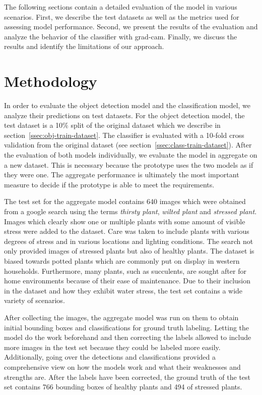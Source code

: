 \documentclass[final]{vutinfth} %
\begin{document}
The following sections contain a detailed evaluation of the model in
various scenarios. First, we describe the test datasets as well as the
metrics used for assessing model performance. Second, we present the
results of the evaluation and analyze the behavior of the classifier
with \gls{grad-cam}. Finally, we discuss the results and identify the
limitations of our approach.

\section{Methodology}
\label{sec:methodology}

In order to evaluate the object detection model and the classification
model, we analyze their predictions on test datasets. For the object
detection model, the test dataset is a 10\% split of the original
dataset which we describe in section~\ref{ssec:obj-train-dataset}. The
classifier is evaluated with a \num{10}-fold cross validation from the
original dataset (see section~\ref{ssec:class-train-dataset}). After
the evaluation of both models individually, we evaluate the model in
aggregate on a new dataset. This is necessary because the prototype
uses the two models as if they were one. The aggregate performance is
ultimately the most important measure to decide if the prototype is
able to meet the requirements.

The test set for the aggregate model contains \num{640} images which
were obtained from a google search using the terms \emph{thirsty
plant}, \emph{wilted plant} and \emph{stressed plant}. Images which
clearly show one or multiple plants with some amount of visible stress
were added to the dataset. Care was taken to include plants with
various degrees of stress and in various locations and lighting
conditions. The search not only provided images of stressed plants but
also of healthy plants. The dataset is biased towards potted plants
which are commonly put on display in western households. Furthermore,
many plants, such as succulents, are sought after for home
environments because of their ease of maintenance. Due to their
inclusion in the dataset and how they exhibit water stress, the test
set contains a wide variety of scenarios.

After collecting the images, the aggregate model was run on them to
obtain initial bounding boxes and classifications for ground truth
labeling. Letting the model do the work beforehand and then correcting
the labels allowed to include more images in the test set because they
could be labeled more easily. Additionally, going over the detections
and classifications provided a comprehensive view on how the models
work and what their weaknesses and strengths are. After the labels
have been corrected, the ground truth of the test set contains
\num{766} bounding boxes of healthy plants and \num{494} of stressed
plants.
\end{document}
